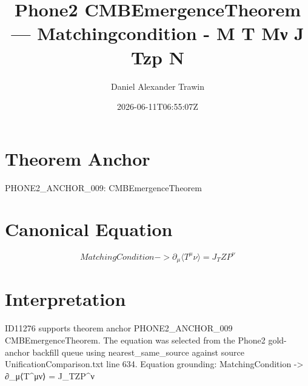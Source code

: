 \documentclass[11pt]{article}
\title{Phone2 CMBEmergenceTheorem — Matchingcondition - Μ T Μν J Tzp Ν}
\author{Daniel Alexander Trawin}
\date{2026-06-11T06:55:07Z}
\begin{document}
\maketitle
\section*{Theorem Anchor}
PHONE2_ANCHOR_009: CMBEmergenceTheorem
\section*{Canonical Equation}
\[
MatchingCondition -> ∂_μ⟨T^μν⟩ = J_TZP^ν
\]
\section*{Interpretation}
ID11276 supports theorem anchor PHONE2_ANCHOR_009 CMBEmergenceTheorem. The equation was selected from the Phone2 gold-anchor backfill queue using nearest_same_source against source UnificationComparison.txt line 634. Equation grounding: MatchingCondition -> ∂_μ⟨T^μν⟩ = J_TZP^ν
\end{document}
